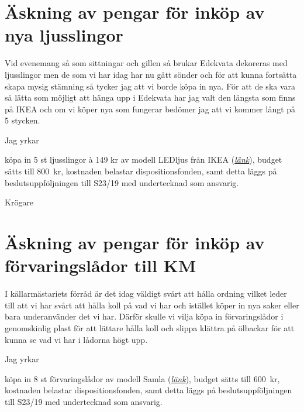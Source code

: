 \documentclass[10pt]{article}
\def\doctype{Handlingar} %
\def\mname{Styrelsemöte} %
\def\mnum{S22/19} %
\begin{document}
    
    \heading{{\doctype} till {\mname} {\mnum}}
    
    \section*{Äskning av pengar för inköp av nya ljusslingor}
    
 	Vid evenemang så som sittningar och gillen så brukar Edekvata dekoreras med ljusslingor men de som vi har idag har nu gått sönder och för att kunna fortsätta skapa mysig stämning så tycker jag att vi borde köpa in nya. För att de ska vara så lätta som möjligt att hänga upp i Edekvata har jag valt den längsta som finns på IKEA och om vi köper nya som fungerar bedömer jag att vi kommer långt på 5 stycken. 

Jag yrkar 


   \begin{attsatser}
        \att köpa in 5 st ljusslingor à 149 kr av modell LEDljus från IKEA (\href{https://www.ikea.com/se/sv/p/ledljus-led-ljusslinga-med-64-ljus-utomhus-svart-80357430/ }{\textit{länk}}),
        \att budget sätts till \SI{800}{kr},
        \att kostnaden belastar dispositionsfonden, samt
        \att detta läggs på beslutsuppföljningen till S23/19 med undertecknad som ansvarig. 
    \end{attsatser}

    \begin{signatures}{1}
    \textit{\ist}
    \signature{Davida Åström}{Krögare}
    \end{signatures}
    



    \newpage

    \section*{Äskning av pengar för inköp av förvaringslådor till KM}
    
 	I källarmästariets förråd är det idag väldigt svårt att hålla ordning vilket leder till att vi har svårt att hålla koll på vad vi har och istället köper in nya saker eller bara underanvänder det vi har.  Därför skulle vi vilja köpa in förvaringslådor i genomskinlig plast för att lättare hålla koll och slippa klättra på ölbackar för att kunna se vad vi har i lådorna högt upp.   

Jag yrkar 


    \begin{attsatser}
        \att köpa in 8 st förvaringslådor av modell Samla (\href{https://www.ikea.com/se/sv/p/samla-lada-med-lock-transparent-s09850874/ }{\textit{länk}}),
        \att budget sätts till \SI{600}{kr},
        \att kostnaden belastar dispositionsfonden, samt
        \att detta läggs på beslutsuppföljningen till S23/19 med undertecknad som ansvarig. 
    \end{attsatser}
\end{document}
